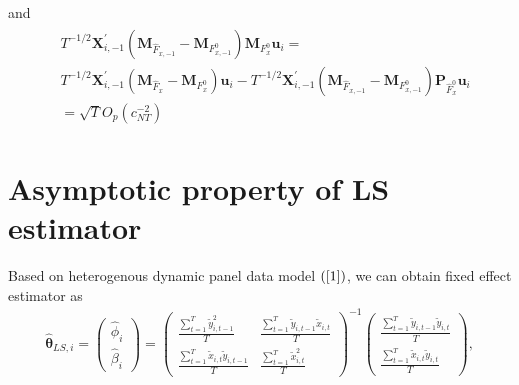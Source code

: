 \documentclass[12pt,a4paper,hyperref]{article}
\begin{document}
and
\begin{align}
\begin{split}
& T^{-1/2} \boldsymbol{X}^{'}_{i,-1}  \left(\boldsymbol{M}_{\hat{F}_{x,-1}} - \boldsymbol{M}_{F^{0}_{x,-1}} \right) \boldsymbol{M}_{F^{0}_{x}}\boldsymbol{u}_{i}= \\
 &T^{-1/2} \boldsymbol{X}^{'}_{i,-1} \left(\boldsymbol{M}_{\hat{F}_{x}}-  \boldsymbol{M}_{F^{0}_{x}} \right) \boldsymbol{u}_{i}- T^{-1/2} \boldsymbol{X}^{'}_{i,-1} \left(\boldsymbol{M}_{\hat{F}_{x,-1}}  -\boldsymbol{M}_{F^{0}_{x,-1}} \right)  \boldsymbol{P}_{\hat{F}^{0}_{x}} \boldsymbol{u}_{i} \\
 &= \sqrt{T}O_{p}\left( c^{-2}_{NT} \right)
\end{split}
\end{align}







\section{Asymptotic property of LS estimator}


Based on heterogenous dynamic panel data model $(\ref{1})$, we can obtain fixed effect estimator as
\begin{align}
\hat{\boldsymbol{\theta}}_{LS,i}=
\begin{pmatrix}
\hat{\phi}_{i} \\
\hat{\beta}_{i}
\end{pmatrix}=
\begin{pmatrix}
\frac{\sum^{T}_{t=1}\tilde{y}^{2}_{i,t-1}}{T} & \frac{\sum^{T}_{t=1}\tilde{y}_{i,t-1}\tilde{x}_{i,t}}{T} \\
\frac{\sum^{T}_{t=1}\tilde{x}_{i,t}\tilde{y}_{i,t-1}}{T} &  \frac{\sum^{T}_{t=1}\tilde{x}_{i,t}^{2}}{T}
\end{pmatrix}^{-1}
\begin{pmatrix}
\frac{\sum^{T}_{t=1}\tilde{y}_{i,t-1}\tilde{y}_{i,t}}{T} \\
\frac{\sum^{T}_{t=1}\tilde{x}_{i,t}\tilde{y}_{i,t}}{T}
\end{pmatrix},
\end{align}
\end{document}
